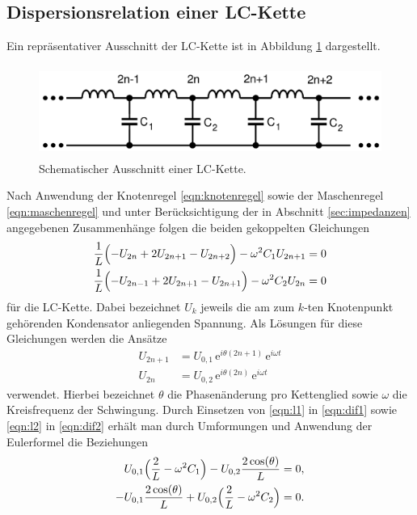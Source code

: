 \subsection{Dispersionsrelation einer LC-Kette}
\label{sec:dispersion}
Ein repräsentativer Ausschnitt der LC-Kette ist in Abbildung \ref{tfig:1} dargestellt.
\begin{figure}[H]
  \centering
  \includegraphics[height=3cm]{theorie_1.png}
  \caption{Schematischer Ausschnitt einer LC-Kette.}
  \label{tfig:1}
\end{figure}
Nach Anwendung der Knotenregel \eqref{eqn:knotenregel} sowie der Maschenregel \eqref{eqn:maschenregel} und unter Berücksichtigung der in Abschnitt \ref{sec:impedanzen} angegebenen Zusammenhänge folgen die beiden gekoppelten Gleichungen
\begin{align}
  \label{eqn:dif1}
  \frac{1}{L} \Bigl( -U_{2n} + 2 U_{2n+1} - U_{2n+2} \Bigr) - \omega^2 C_1 U_{2n+1} &= 0 \\
  \label{eqn:dif2}
  \frac{1}{L} \Bigl( -U_{2n-1} + 2 U_{2n+1} - U_{2n+1} \Bigr) - \omega^2 C_2 U_{2n} &= 0
\end{align}
für die LC-Kette.
Dabei bezeichnet $U_k$ jeweils die am zum $k$-ten Knotenpunkt gehörenden Kondensator anliegenden Spannung.
Als Lösungen für diese Gleichungen werden die Ansätze
\begin{align}
  \label{eqn:l1}
U_{2n+1} &= U_{0,1} \, \mathrm{e}^{i \theta (2n+1)} \, \mathrm{e}^{ i \omega t} \\
  \label{eqn:l2}
U_{2n} &= U_{0,2} \, \mathrm{e}^{i \theta (2n)} \, \mathrm{e}^{ i \omega t}
\end{align}
verwendet.
Hierbei bezeichnet $\theta$ die Phasenänderung pro Kettenglied sowie $\omega$ die Kreisfrequenz der Schwingung.
Durch Einsetzen von \eqref{eqn:l1} in \eqref{eqn:dif1} sowie \eqref{eqn:l2} in \eqref{eqn:dif2} erhält man durch Umformungen und Anwendung der Eulerformel die Beziehungen
\begin{align}
U_{0,1} \Bigl( \frac{2}{L} - \omega^2 C_1  \Bigr) - U_{0,2} \frac{2 \cos (\theta)}{L} &= 0, \\
-U_{0,1} \frac{2 \cos (\theta)}{L} + U_{0,2} \Bigl( \frac{2}{L} - \omega^2 C_2  \Bigr)  &= 0.
\end{align}
